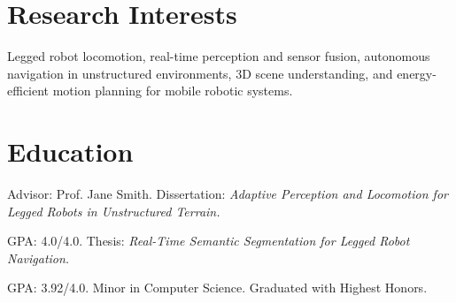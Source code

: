 \documentclass{slate-resume}
\begin{document}

\section{Research Interests}
\begin{entryblock}
Legged robot locomotion, real-time perception and sensor fusion, autonomous navigation in unstructured environments, 3D scene understanding, and energy-efficient motion planning for mobile robotic systems.
\end{entryblock}

\section{Education}
\begin{entryblock}
Advisor: Prof. Jane Smith. Dissertation: \textit{Adaptive Perception and Locomotion for Legged Robots in Unstructured Terrain.}
\end{entryblock}
\entrygap
\begin{entryblock}
GPA: 4.0/4.0. Thesis: \textit{Real-Time Semantic Segmentation for Legged Robot Navigation.}
\end{entryblock}
\entrygap
\begin{entryblock}
GPA: 3.92/4.0. Minor in Computer Science. Graduated with Highest Honors.
\end{entryblock}
\end{document}
